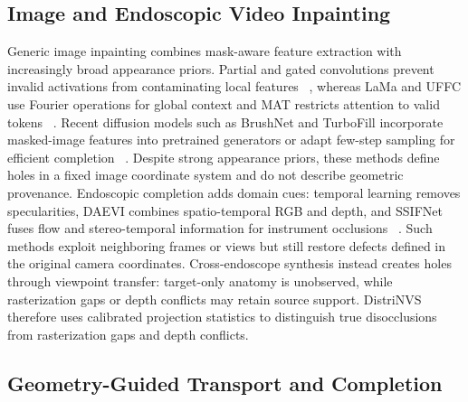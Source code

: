 \documentclass[letterpaper,10pt,conference]{ieeeconf}
\begin{document}
\subsection{Image and Endoscopic Video Inpainting}

Generic image inpainting combines mask-aware feature extraction with
increasingly broad appearance priors. Partial and gated convolutions prevent
invalid activations from contaminating local features
~\cite{liu2018partial,yu2019gated}, whereas LaMa and UFFC use Fourier operations
for global context and MAT restricts attention to valid tokens
~\cite{suvorov2022lama,chu2023uffc,li2022mat}. Recent diffusion models such as
BrushNet and TurboFill incorporate masked-image features into pretrained
generators or adapt few-step sampling for efficient completion
~\cite{ju2024brushnet,xie2025turbofill}. Despite strong appearance priors, these
methods define holes in a fixed image coordinate system and do not describe
geometric provenance. Endoscopic completion adds domain cues: temporal learning
removes specularities, DAEVI combines spatio-temporal RGB and depth, and SSIFNet
fuses flow and stereo-temporal information for instrument occlusions
~\cite{daher2023temporal,zhang2024daevi,zou2025ssifnet}. Such methods exploit
neighboring frames or views but still restore defects defined in the original
camera coordinates. Cross-endoscope synthesis instead creates holes through
viewpoint transfer: target-only anatomy is unobserved, while rasterization gaps
or depth conflicts may retain source support. DistriNVS therefore uses
calibrated projection statistics to distinguish true disocclusions from
rasterization gaps and depth conflicts.

\subsection{Geometry-Guided Transport and Completion}
\end{document}
